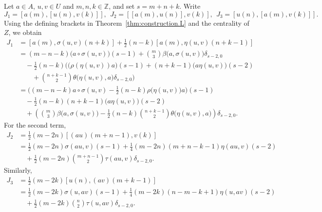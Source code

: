 \documentclass[12pt]{article}
\numberwithin{equation}{section}
\theoremstyle{definition}
\theoremstyle{plain}
\newcommand{\bZ}{\ensuremath{\mathbb{Z}}}
\begin{document}
Let $a\in A$, $u,v\in U$ and $m,n,k\in\bZ$, and set $s=m+n+k$. Write
\begin{equation*}
    J_1=[a(m),[u(n),v(k)]],\ \ J_2=[[a(m),u(n)],v(k)],\ \ J_3=[u(n),[a(m),v(k)]].
\end{equation*}
Using the defining brackets in Theorem~\ref{thm:construction.L} and the centrality of $Z$, we obtain
\allowdisplaybreaks[1]
\begin{align*}
    J_1&=[a(m),\sigma(u,v)(n+k)]+\frac12(n-k)[a(m),\eta(u,v)(n+k-1)]\\
    &=(m-n-k)\big(a\circ\sigma(u,v)\big)(s-1)+\binom{m}{3}\beta\big(a,\sigma(u,v)\big)\delta_{s-2,0}\\
    &\quad-\frac{1}{2}(n-k)\Big(\big(\rho(\eta(u,v))a\big)(s-1)+(n+k-1)\big(a\eta(u,v)\big)(s-2)\\
    &\qquad+\binom{n+k-1}{2}\theta\big(\eta(u,v),a\big)\delta_{s-2,0}\Big)\\
    &=\Big((m-n-k)a\circ\sigma(u,v)-\frac12(n-k)\rho\big(\eta(u,v)\big)a\Big)(s-1)\\
    &\quad-\frac12(n-k)(n+k-1)\big(a\eta(u,v)\big)(s-2)\\
    &\quad+\left(\binom m3\beta\big(a,\sigma(u,v)\big)-\frac12(n-k)\binom{n+k-1}{2}\theta\big(\eta(u,v),a\big)\right)\delta_{s-2,0}.
\end{align*}
For the second term,
\begin{align*}
    J_2&=\frac12(m-2n)[(au)(m+n-1),v(k)]\\
    &=\frac12(m-2n)\sigma(au,v)(s-1)+\frac14(m-2n)(m+n-k-1)\eta(au,v)(s-2)\\
    &\quad+\frac12(m-2n)\binom{m+n-1}{2}\tau(au,v)\delta_{s-2,0}.
\end{align*}
Similarly,
\begin{align*}
    J_3&=\frac12(m-2k)[u(n),(av)(m+k-1)]\\
    &=\frac12(m-2k)\sigma(u,av)(s-1)+\frac14(m-2k)(n-m-k+1)\eta(u,av)(s-2)\\
    &\quad+\frac12(m-2k)\binom n2\tau(u,av)\delta_{s-2,0}.
\end{align*}
\end{document}
